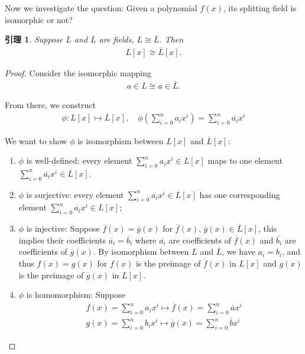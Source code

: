 \documentclass[utf8]{ctexbook}
\newtheorem{lemma}{引理}[section]
\begin{document}
Now we investigate the question: Given a polynomial $f(x)$, its splitting field is isomorphic or not?


\begin{lemma}
\label{lemma_4_4_1_poly_field_iso}
Suppose $L$ and $\overline{L}$ are fields, $ L \cong \overline{L}$. Then
\begin{align*}
L[x] \cong \overline{L} [x] .
\end{align*}
\end{lemma}

\begin{proof}
Consider the isomorphic mapping
\begin{align*}
a \in L \cong \overline{a} \in \overline{L} .
\end{align*}

From there, we construct
\begin{align*}
\phi : L[x] \mapsto \overline{L}[x], \quad \phi( \sum_{i=0} ^n a_i x^i ) = \sum_{i=0} ^n \overline{a_i} x^i
\end{align*}

We want to show $\phi$ is isomorphism between $L[x]$ and $\overline{L} [x]$:
\begin{enumerate}
\item{$\phi$ is well-defined: every element $\sum_{i=0} ^n a_i x^i \in L[x]$ maps to one element $\sum_{i=0} ^n \overline{a_i} x^i \in \overline{L}[x]$. }
\item{$\phi$ is surjective: every element $\sum_{i=0} ^n \overline{a_i} x^i \in \overline{L}[x]$ has one corresponding element $\sum_{i=0} ^n a_i x^i \in L[x]$;}
\item{$\phi$ is injective: Suppose $\overline{f} (x) = \overline{g} (x)$ for $\overline{f}(x)$, $\overline{g}(x) \in \overline{L}[x] $, this implies their coefficients $\overline{a_i} = \overline{b_i}$ where $\overline{a_i}$ are coefficients of $\overline{f}(x)$ and $\overline{b_i}$ are coefficients of $\overline{g}(x)$. By isomorphism between $L$ and $\overline{L}$, we have $a_i = b_i$, and thus $f(x) = g(x)$ for $f(x)$ is the preimage of $\overline{f}(x)$ in $L[x]$ and $g(x)$ is the preimage of $\overline{g}(x)$ in $L[x]$.
}
\item{$\phi$ is homomorphism: Suppose
\begin{align*}
& f(x) = \sum_{i=0} ^n a_i x^i  \mapsto \overline{f} (x) = \sum_{i=0} ^n \overline{a} x^i \\
& g(x) = \sum_{i=0} ^n b_i x^i  \mapsto \overline{g} (x) = \sum_{i=0} ^n \overline{b} x^i  
\end{align*}

}
\end{enumerate}
\end{proof}
\end{document}
